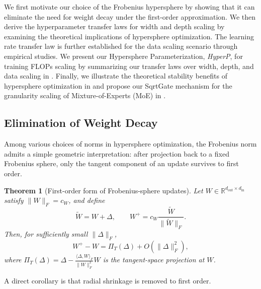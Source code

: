 \documentclass{article}
\newtheorem{theorem}{Theorem}[]
\begin{document}

We first motivate our choice of the Frobenius hypersphere by showing that it can eliminate the need for weight decay under the first-order approximation. We then derive the hyperparameter transfer laws for width and depth scaling by examining the theoretical implications of hypersphere optimization. The learning rate transfer law is further established for the data scaling scenario through empirical studies. We present our Hypersphere Parameterization, \emph{HyperP}, for training FLOPs scaling by summarizing our transfer laws over width, depth, and data scaling in . Finally, we illustrate the theoretical stability benefits of hypersphere optimization in  and propose our SqrtGate mechanism for the granularity scaling of Mixture-of-Experts (MoE) in .

\subsection{Elimination of Weight Decay}\label{sec:wd}

Among various choices of norms in hypersphere optimization, the Frobenius norm admits a simple geometric interpretation: after projection back to a fixed Frobenius sphere, only the tangent component of an update survives to first order.

\begin{theorem}[First-order form of Frobenius-sphere updates]
\label{thm:fnorm_tangent_update}
Let $W\in\mathbb{R}^{d_{\mathrm{out}}\times d_{\mathrm{in}}}$ satisfy $\|W\|_F=c_W$, and define
\begin{equation}
\widetilde W = W + \Delta,
\qquad
W^+ = c_W \frac{\widetilde W}{\|\widetilde W\|_F}.
\label{eq:fnorm_projected_update_main}
\end{equation}
Then, for sufficiently small $\|\Delta\|_F$,
\begin{equation}
W^+ - W
=
\Pi_T(\Delta) + O(\|\Delta\|_F^2),
\label{eq:fnorm_tangent_expansion_main}
\end{equation}
where
$
\Pi_T(\Delta)
=
\Delta - \frac{\langle \Delta, W\rangle_F}{\|W\|_F^2}W
$
is the tangent-space projection at $W$.
\end{theorem}

A direct corollary is that radial shrinkage is removed to first order.
\end{document}

